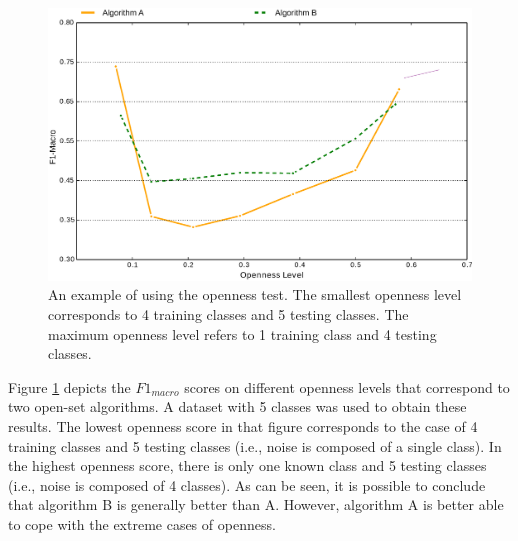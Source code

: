 \begin{figure}[t]
	\begin{center}
    	\includegraphics[scale=0.50]{Figures/openness_test_for_f1_scores_example.eps}
		\caption{An example of using the openness test. The smallest openness level corresponds to 4 training classes and 5 testing classes. The maximum openness level refers to 1 training class and 4 testing classes.}
		\label{chap:eval_methods:fig:openness}
	\end{center}
\end{figure}


Figure \ref{chap:eval_methods:fig:openness} depicts the $F1_{macro}$ scores on different openness levels that correspond to two open-set algorithms. A dataset with 5 classes was used to obtain these results. The lowest openness score in that figure corresponds to the case of 4 training classes and 5 testing classes (i.e., noise is composed of a single class). In the highest openness score, there is only one known class and 5 testing classes (i.e., noise is composed of 4 classes). As can be seen, it is possible to conclude that algorithm B is generally better than A. However, algorithm A is better able to cope with the extreme cases of openness.
 



